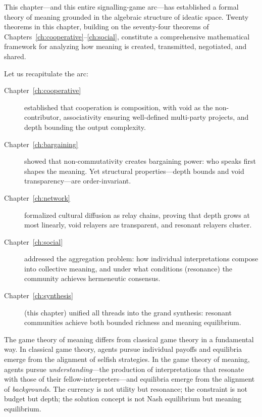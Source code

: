 This chapter---and this entire signalling-game arc---has established a
formal theory of meaning grounded in the algebraic structure of ideatic
space.  Twenty theorems in this chapter, building on the seventy-four
theorems of Chapters~\ref{ch:cooperative}--\ref{ch:social}, constitute a
comprehensive mathematical framework for analyzing how meaning is created,
transmitted, negotiated, and shared.

Let us recapitulate the arc:

\begin{description}
  \item[Chapter~\ref{ch:cooperative}] established that cooperation is
    composition, with void as the non-contributor, associativity ensuring
    well-defined multi-party projects, and depth bounding the output
    complexity.

  \item[Chapter~\ref{ch:bargaining}] showed that non-commutativity creates
    bargaining power: who speaks first shapes the meaning.  Yet structural
    properties---depth bounds and void transparency---are order-invariant.

  \item[Chapter~\ref{ch:network}] formalized cultural diffusion as relay
    chains, proving that depth grows at most linearly, void relayers are
    transparent, and resonant relayers cluster.

  \item[Chapter~\ref{ch:social}] addressed the aggregation problem: how
    individual interpretations compose into collective meaning, and under
    what conditions (resonance) the community achieves hermeneutic
    consensus.

  \item[Chapter~\ref{ch:synthesis}] (this chapter) unified all threads
    into the grand synthesis: resonant communities achieve both bounded
    richness and meaning equilibrium.
\end{description}

The game theory of meaning differs from classical game theory in a
fundamental way.  In classical game theory, agents pursue individual
payoffs and equilibria emerge from the alignment of selfish strategies.
In the game theory of meaning, agents pursue \emph{understanding}---the
production of interpretations that resonate with those of their
fellow-interpreters---and equilibria emerge from the alignment of
\emph{backgrounds}.  The currency is not utility but resonance; the
constraint is not budget but depth; the solution concept is not Nash
equilibrium but meaning equilibrium.

